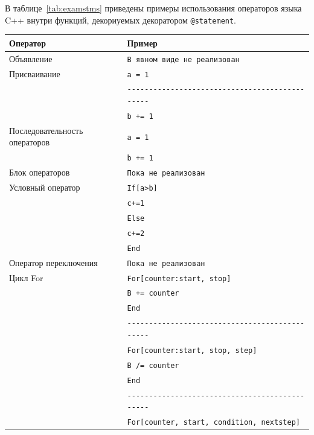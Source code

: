 В таблице~\ref{tab:examstms} приведены примеры использования операторов языка {\sf C++} внутри функций, декориуемых декоратором \verb"@statement".

\begin{table}
    \begin{center}
        \begin{tabular}{|l|l|}
            \hline
            Оператор & Пример\\
            \hline
            Объявление & \verb"В явном виде не реализован"\\
            \hline
            Присваивание & \verb"a = 1" \\
                         & \verb"----------------------------------------------" \\
                         & \verb"b += 1" \\
            \hline
            Последовательность операторов & \verb"a = 1" \\
                                          & \verb"b += 1" \\
            \hline
            Блок операторов &\verb"Пока не реализован" \\
            \hline
            Условный оператор & \verb"If[a>b]"\\
                              & \verb"c+=1"\\
                              & \verb"Else"\\
                              & \verb"c+=2"\\
                              & \verb"End"\\
            \hline
            Оператор переключения & \verb"Пока не реализован"\\
            \hline
            Цикл For & \verb"For[counter:start, stop]" \\
                     & \verb"B += counter"\\
                     & \verb"End"\\
                     & \verb"----------------------------------------------" \\
                     & \verb"For[counter:start, stop, step]"\\
                     & \verb"B /= counter"\\
                     & \verb"End"\\
                     & \verb"----------------------------------------------" \\
                     & \verb"For[counter, start, condition, nextstep]"\\

\end{tabular}
\end{center}
\end{table}

